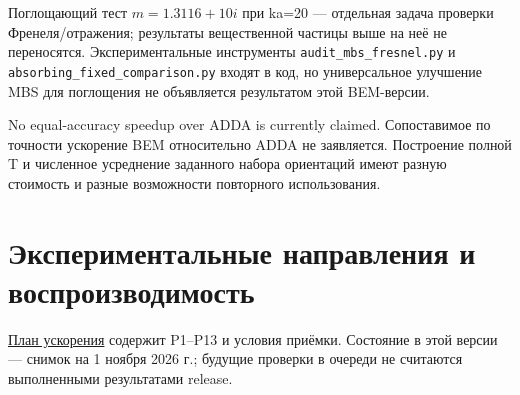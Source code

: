\documentclass[
  russian,
  11pt,
  a4paper,
]{report}
\begin{document}
Поглощающий тест \(m=1.3116+10i\) при ka=20 --- отдельная задача
проверки Френеля/отражения; результаты вещественной частицы выше на неё
не переносятся. Экспериментальные инструменты
\nolinkurl{audit_mbs_fresnel.py} и
\nolinkurl{absorbing_fixed_comparison.py} входят в код, но универсальное
улучшение MBS для поглощения не объявляется результатом этой BEM-версии.

No equal-accuracy speedup over ADDA is currently claimed. Сопоставимое
по точности ускорение BEM относительно ADDA не заявляется. Построение
полной T и численное усреднение заданного набора ориентаций имеют разную
стоимость и разные возможности повторного использования.

\chapter{Экспериментальные направления и
воспроизводимость}\label{ux44dux43aux441ux43fux435ux440ux438ux43cux435ux43dux442ux430ux43bux44cux43dux44bux435-ux43dux430ux43fux440ux430ux432ux43bux435ux43dux438ux44f-ux438-ux432ux43eux441ux43fux440ux43eux438ux437ux432ux43eux434ux438ux43cux43eux441ux442ux44c}

\href{docs/acceleration_plan.md}{План ускорения} содержит P1--P13 и
условия приёмки. Состояние в этой версии --- снимок на 1 ноября 2026 г.;
будущие проверки в очереди не считаются выполненными результатами
release.
\end{document}
